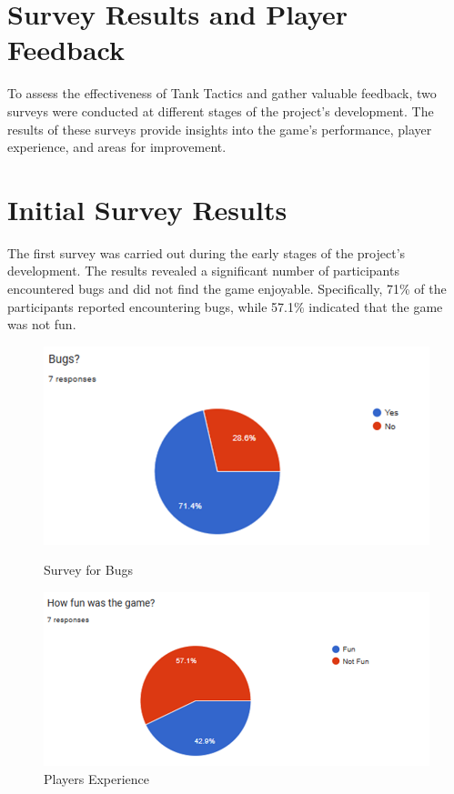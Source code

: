 \section{Survey Results and Player Feedback}
To assess the effectiveness of Tank Tactics and gather valuable feedback, two surveys were conducted at different stages of the project's development. The results of these surveys provide insights into the game's performance, player experience, and areas for improvement.

\section{Initial Survey Results}
The first survey was carried out during the early stages of the project's development. The results revealed a significant number of participants encountered bugs and did not find the game enjoyable. Specifically, 71\% of the participants reported encountering bugs, while 57.1\% indicated that the game was not fun.
\\

\begin{figure}[h]
    \centering
    \begin{minipage}{0.49\textwidth}
    \centering
    \includegraphics[width=1\textwidth]{figures/Bug1.png}
    \caption{Survey for Bugs}
    \label{fig:bug_survey}
    \end{minipage}
    \hfill
    \begin{minipage}{0.49\textwidth}
    \centering
    \includegraphics[width=1\textwidth]{figures/Fun1.png}
    \caption{Players Experience}
    \label{fig:player_experience}
    \end{minipage}
\end{figure}



